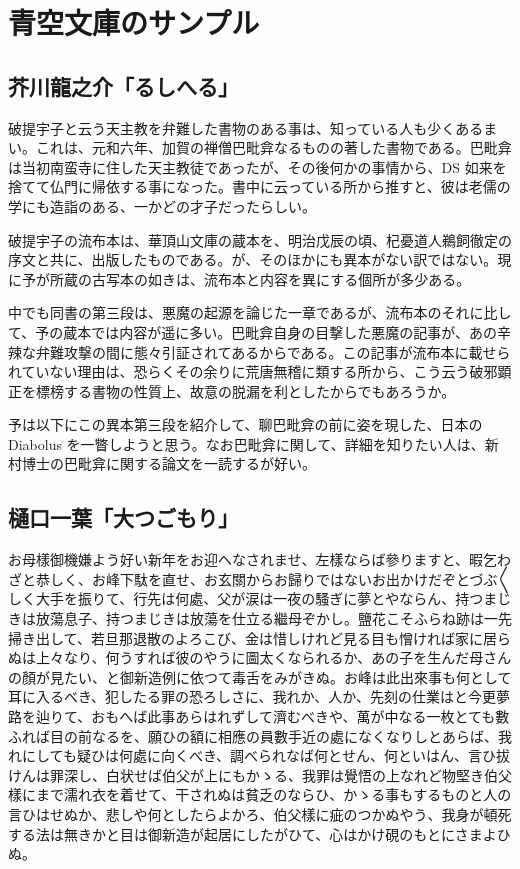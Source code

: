 \documentclass{utreport}
\begin{document}
\chapter{青空文庫のサンプル}
\section{芥川龍之介「るしへる」}

破提宇子と云う天主教を弁難した書物のある事は、知っている人も少くあるまい。これは、元和六年、加賀の禅僧巴毗弇なるものの著した書物である。巴毗弇は当初南蛮寺に住した天主教徒であったが、その後何かの事情から、DS 如来を捨てて仏門に帰依する事になった。書中に云っている所から推すと、彼は老儒の学にも造詣のある、一かどの才子だったらしい。

破提宇子の流布本は、華頂山文庫の蔵本を、明治戊辰の頃、杞憂道人鵜飼徹定の序文と共に、出版したものである。が、そのほかにも異本がない訳ではない。現に予が所蔵の古写本の如きは、流布本と内容を異にする個所が多少ある。

中でも同書の第三段は、悪魔の起源を論じた一章であるが、流布本のそれに比して、予の蔵本では内容が遥に多い。巴毗弇自身の目撃した悪魔の記事が、あの辛辣な弁難攻撃の間に態々引証されてあるからである。この記事が流布本に載せられていない理由は、恐らくその余りに荒唐無稽に類する所から、こう云う破邪顕正を標榜する書物の性質上、故意の脱漏を利としたからでもあろうか。

予は以下にこの異本第三段を紹介して、聊巴毗弇の前に姿を現した、日本の Diabolus を一瞥しようと思う。なお巴毗弇に関して、詳細を知りたい人は、新村博士の巴毗弇に関する論文を一読するが好い。


\section{樋口一葉「大つごもり」}

お母樣御機嫌よう好い新年をお迎へなされませ、左樣ならば參りますと、暇乞わざと恭しく、お峰下駄を直せ、お玄關からお歸りではないお出かけだぞとづぶ〳〵しく大手を振りて、行先は何處、父が涙は一夜の騷ぎに夢とやならん、持つまじきは放蕩息子、持つまじきは放蕩を仕立る繼母ぞかし。鹽花こそふらね跡は一先掃き出して、若旦那退散のよろこび、金は惜しけれど見る目も憎ければ家に居らぬは上々なり、何うすれば彼のやうに圖太くなられるか、あの子を生んだ母さんの顏が見たい、と御新造例に依つて毒舌をみがきぬ。お峰は此出來事も何として耳に入るべき、犯したる罪の恐ろしさに、我れか、人か、先刻の仕業はと今更夢路を辿りて、おもへば此事あらはれずして濟むべきや、萬が中なる一枚とても數ふれば目の前なるを、願ひの額に相應の員數手近の處になくなりしとあらば、我れにしても疑ひは何處に向くべき、調べられなば何とせん、何といはん、言ひ拔けんは罪深し、白状せば伯父が上にもかゝる、我罪は覺悟の上なれど物堅き伯父樣にまで濡れ衣を着せて、干されぬは貧乏のならひ、かゝる事もするものと人の言ひはせぬか、悲しや何としたらよかろ、伯父樣に疵のつかぬやう、我身が頓死する法は無きかと目は御新造が起居にしたがひて、心はかけ硯のもとにさまよひぬ。
\end{document}
